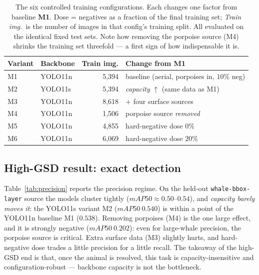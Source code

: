 \documentclass[11pt,a4paper]{article}
\newcommand{\map}{mAP}
\begin{document}
\begin{table}[t]
\centering
\caption{The six controlled training configurations. Each changes one factor
from baseline \textbf{M1}. Dose = negatives as a fraction of the final training
set; \emph{Train img.}\ is the number of images in that config's training split.
All evaluated on the identical fixed test sets. Note how removing the porpoise
source (M4) shrinks the training set threefold --- a first sign of how
indispensable it is.}
\label{tab:exp}
\small
\setlength{\tabcolsep}{5pt}
\begin{tabular}{llrl}
\toprule
Variant & Backbone & Train img. & Change from M1 \\
\midrule
M1  & YOLO11n & 5{,}394 & baseline (aerial, porpoises in, $10\%$ neg) \\
M2  & YOLO11s & 5{,}394 & \emph{capacity} $\uparrow$ (same data as M1) \\
M3  & YOLO11n & 8{,}618 & $+$ four surface sources \\
M4  & YOLO11n & 1{,}506 & porpoise source \emph{removed} \\
M5  & YOLO11n & 4{,}855 & hard-negative dose $0\%$ \\
M6  & YOLO11n & 6{,}069 & hard-negative dose $20\%$ \\
\bottomrule
\end{tabular}
\end{table}

\subsection{High-GSD result: exact detection}
Table~\ref{tab:precision} reports the precision regime. On the held-out
\texttt{whale-bbox-layer} source the models cluster tightly
($\map50 \approx 0.50$--$0.54$), and \emph{capacity barely moves it}: the
YOLO11s variant M2 ($\map50\ 0.540$) is within a point of the YOLO11n
baseline M1 ($0.538$). Removing porpoises (M4) is the one large effect, and it is
strongly negative ($\map50\ 0.202$): even for large-whale precision, the
porpoise source is critical. Extra surface data (M3) slightly hurts, and
hard-negative dose trades a little precision for a little recall. The takeaway of
the high-GSD end is that, once the animal is resolved, this task is
capacity-insensitive and configuration-robust --- backbone capacity is not the
bottleneck.
\end{document}
